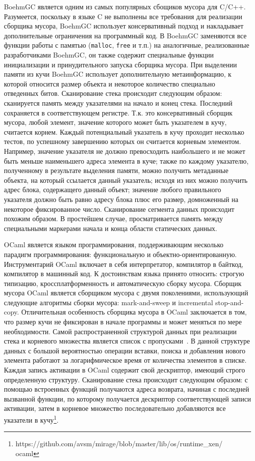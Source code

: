 BoehmGC является одним из самых популярных сбощиков мусора для C/C++. Разумеется, поскольку в языке C не выполнены все требования для 
реализации сборщика мусора, BoehmGC использует консервативный подход и накладывает дополнительные ограничения на программный код. 
В BoehmGC заменяются все функции работы с памятью (\texttt{malloc}, \texttt{free} и т.п.) на аналогичные, реализованные разработчиками 
BoehmGC, он также содержит специальные функции инициализации и принудительного запуска сборщика мусора. При выделении памяти из кучи 
BoehmGC использует дополнительную метаинформацию, к которой относится размер объекта и некоторое количество специально отведенных битов.
Сканирование стека происходит следующим образом: сканируется память между указателями на начало и конец стека. Последний сохраняется в 
соответствующем регистре. Т.к. это консервативный сборщик мусора, любой элемент, значение которого может быть указателем в кучу, считается 
корнем. Каждый потенциальный указатель в кучу проходит несколько тестов, по успешному завершению которых он считается корневым элементом. 
Например, значение указателя не должно превосходить наибольшего и не может быть меньше наименьшего адреса элемента в куче; также по каждому 
указателю, полученному в результате выделения памяти, можно получить метаданные объекта, на который ссылается данный указатель; исходя из них 
можно получить адрес блока, содержащего данный объект; значение любого правильного указателя должно быть равно адресу блока плюс его размер, 
домноженный на некоторое фиксированное число. Сканирование сегмента данных происходит похожим образом. В простейшем случае, просматривается 
память между специальными маркерами начала и конца области статических данных.

OCaml является языком программирования, поддерживающим несколько парадигм программирования: функциональную и
объектно-ориентированную. Инструментарий OCaml включает в себя интерпретатор, компилятор в байткод, компилятор в
машинный код. К достоинствам языка принято относить: строгую типизацию, кроссплатформенность и автоматическую
сборку мусора. Сборщик мусора OCaml является сборщиком мусора с двумя поколениями, использующий следующие
алгоритмы сборки мусора: mark-and-sweep и incremental stop-and-copy. Отличительная особенность сборщика мусора
в OCaml заключается в том, что размер кучи не фиксирован в начале программы и может меняться по мере необходимости.
Самой распространенной структурой данных при реализации стека и корневого множества является список с пропусками~\cite{ref4}.
В данной структуре данных с большой вероятностью операции вставки, поиска и добавления нового элемента работают за логарифмическое 
время от количества элементов в списке. Каждая запись активации в OCaml содержит свой дескриптор, имеющий строго определенную структуру. 
Сканирование стека происходит следующим образом: с помощью встроенных функций получаются адреса возврата, начиная с последней вызванной функции, 
по которому получается дескриптор соответствующей записи активации, затем в корневое множество последовательно добавляются все указатели в 
кучу\footnote{https://github.com/avsm/mirage/blob/master/lib/os/runtime\_xen/\\
ocaml}.


